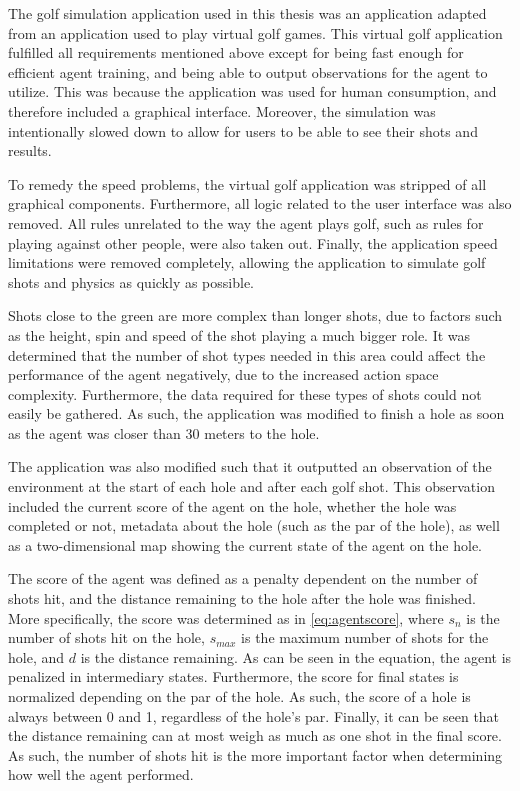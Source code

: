 \documentclass{kththesis}
\begin{document}
The golf simulation application used in this thesis was an application adapted from an application used to play virtual golf games. This virtual golf application fulfilled all requirements mentioned above except for being fast enough for efficient agent training, and being able to output observations for the agent to utilize. This was because the application was used for human consumption, and therefore included a graphical interface. Moreover, the simulation was intentionally slowed down to allow for users to be able to see their shots and results. 

To remedy the speed problems, the virtual golf application was stripped of all graphical components. Furthermore, all logic related to the user interface was also removed. All rules unrelated to the way the agent plays golf, such as rules for playing against other people, were also taken out. Finally, the application speed limitations were removed completely, allowing the application to simulate golf shots and physics as quickly as possible.

Shots close to the green are more complex than longer shots, due to factors such as the height, spin and speed of the shot playing a much bigger role. It was determined that the number of shot types needed in this area could affect the performance of the agent negatively, due to the increased action space complexity. Furthermore, the data required for these types of shots could not easily be gathered. As such, the application was modified to finish a hole as soon as the agent was closer than 30 meters to the hole.

The application was also modified such that it outputted an observation of the environment at the start of each hole and after each golf shot. This observation included the current score of the agent on the hole, whether the hole was completed or not, metadata about the hole (such as the par of the hole), as well as a two-dimensional map showing the current state of the agent on the hole.

The score of the agent was defined as a penalty dependent on the number of shots hit, and the distance remaining to the hole after the hole was finished. More specifically, the score was determined as in \autoref{eq:agentscore}, where $s_n$ is the number of shots hit on the hole, $s_{max}$ is the maximum number of shots for the hole, and $d$ is the distance remaining. As can be seen in the equation, the agent is penalized in intermediary states. Furthermore, the score for final states is normalized depending on the par of the hole. As such, the score of a hole is always between 0 and 1, regardless of the hole's par. Finally, it can be seen that the distance remaining can at most weigh as much as one shot in the final score. As such, the number of shots hit is the more important factor when determining how well the agent performed. 
\end{document}

